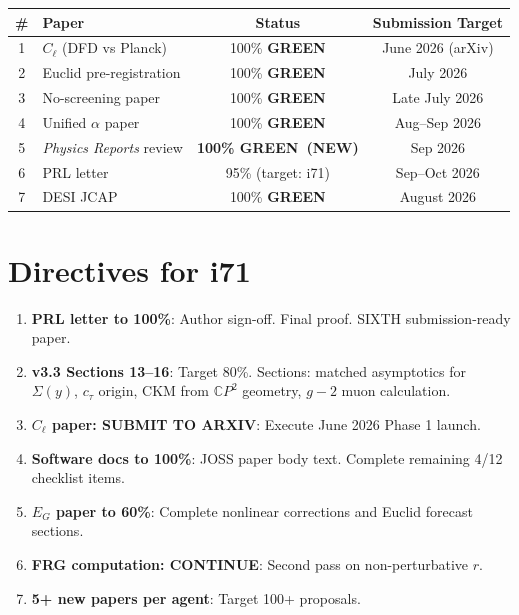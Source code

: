 \documentclass[11pt,a4paper]{article}
\newcommand{\GREEN}{\textcolor{dfdgreen}{\textbf{GREEN}}}
\newcommand{\CP}{\mathbb{C}P}
\begin{document}
\begin{center}
\begin{tabular}{clcc}
\toprule
\textbf{\#} & \textbf{Paper} & \textbf{Status} & \textbf{Submission Target} \\
\midrule
1 & $C_\ell$ (DFD vs Planck) & 100\% \GREEN & June 2026 (arXiv) \\
2 & Euclid pre-registration & 100\% \GREEN & July 2026 \\
3 & No-screening paper & 100\% \GREEN & Late July 2026 \\
4 & Unified $\alpha$ paper & 100\% \GREEN & Aug--Sep 2026 \\
5 & \textit{Physics Reports} review & \textbf{100\% \GREEN\ (NEW)} & Sep 2026 \\
\midrule
6 & PRL letter & 95\% (target: i71) & Sep--Oct 2026 \\
7 & DESI JCAP & 100\% \GREEN & August 2026 \\
\bottomrule
\end{tabular}
\end{center}


\section{Directives for i71}
\label{sec:directives}

\begin{enumerate}
\item \textbf{PRL letter to 100\%}: Author sign-off. Final proof. SIXTH submission-ready paper.
\item \textbf{v3.3 Sections 13--16}: Target 80\%. Sections: matched asymptotics for $\Sigma(y)$, $c_\tau$ origin, CKM from $\CP^2$ geometry, $g-2$ muon calculation.
\item \textbf{$C_\ell$ paper: SUBMIT TO ARXIV}: Execute June 2026 Phase 1 launch.
\item \textbf{Software docs to 100\%}: JOSS paper body text. Complete remaining 4/12 checklist items.
\item \textbf{$E_G$ paper to 60\%}: Complete nonlinear corrections and Euclid forecast sections.
\item \textbf{FRG computation: CONTINUE}: Second pass on non-perturbative $r$.
\item \textbf{5+ new papers per agent}: Target 100+ proposals.
\end{enumerate}
\end{document}
